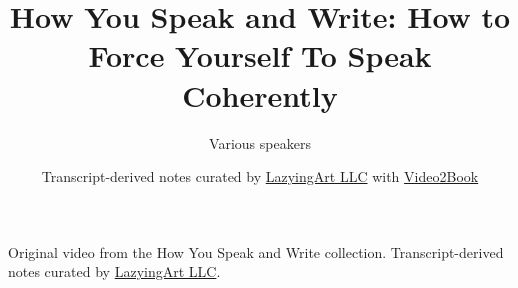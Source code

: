\documentclass[11pt,oneside]{book}
\begin{document}
\frontmatter
\title{How You Speak and Write: How to Force Yourself To Speak Coherently}
\author{Various speakers}
\date{Transcript-derived notes curated by \href{https://lazying.art}{LazyingArt LLC} with \href{https://github.com/lachlanchen/Video2Book}{Video2Book}}
\maketitle
\begin{center}
\small Original video from the How You Speak and Write collection. Transcript-derived notes curated by \href{https://lazying.art}{LazyingArt LLC}.
\end{center}
\clearpage
\mainmatter

\end{document}
